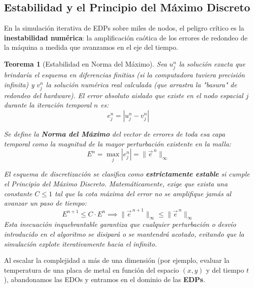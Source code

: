 \documentclass[12pt]{article}
\newtheorem{teorema}{Teorema}
\begin{document}
\subsection*{Estabilidad y el Principio del Máximo Discreto}
En la simulación iterativa de EDPs sobre miles de nodos, el peligro crítico es la \textbf{inestabilidad numérica}: la amplificación caótica de los errores de redondeo de la máquina a medida que avanzamos en el eje del tiempo.

\begin{teorema}[Estabilidad en Norma del Máximo]
Sea $u_j^n$ la solución exacta que brindaría el esquema en diferencias finitias (si la computadora tuviera precisión infinita) y $v_j^n$ la solución numérica real calculada (que arrastra la "basura" de redondeo del hardware). El error absoluto aislado que existe en el nodo espacial $j$ durante la iteración temporal $n$ es:
\begin{equation}
    e_j^n = |u_j^n - v_j^n|
\end{equation}

Se define la \textbf{Norma del Máximo} del vector de errores de toda esa capa temporal como la magnitud de la mayor perturbación existente en la malla:
\begin{equation}
    E^n = \max_j |e_j^n| = \|\vec{e}^{\,n}\|_\infty
\end{equation}

El esquema de discretización se clasifica como \textbf{estrictamente estable} si cumple el Principio del Máximo Discreto. Matemáticamente, exige que exista una constante $C \le 1$ tal que la cota máxima del error no se amplifique jamás al avanzar un paso de tiempo:
\begin{equation}
    E^{n+1} \le C \cdot E^n \implies \|\vec{e}^{\,n+1}\|_\infty \le \|\vec{e}^{\,n}\|_\infty
\end{equation}
Esta inecuación inquebrantable garantiza que cualquier perturbación o desvío introducido en el algoritmo se disipará o se mantendrá acotado, evitando que la simulación explote iterativamente hacia el infinito.
\end{teorema}

Al escalar la complejidad a más de una dimensión (por ejemplo, evaluar la temperatura de una placa de metal en función del espacio $(x,y)$ y del tiempo $t$), abandonamos las EDOs y entramos en el dominio de las \textbf{EDPs}. 
\end{document}
